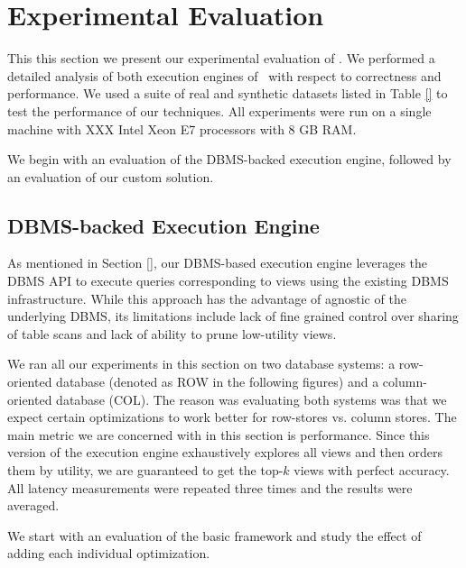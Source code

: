 \section{Experimental Evaluation}
\label{sec:experiments}

This this section we present our experimental evaluation of \VizRecDB.
We performed a detailed analysis of both execution engines of \VizRecDB\ with
respect to correctness and performance.
We used a suite of real and synthetic datasets listed in Table \ref{} to test the
performance of our techniques.
All experiments were run on a single
machine with XXX Intel Xeon E7 processors with 8 GB
RAM.

We begin with an evaluation of the DBMS-backed execution engine, followed by an
evaluation of our custom solution.

\subsection{DBMS-backed Execution Engine}
\label{sec:dbms_execution_engine}

As mentioned in Section \ref{}, our DBMS-based execution engine leverages the
DBMS API to execute queries corresponding to views using the existing DBMS
infrastructure.
While this approach has the advantage of agnostic of the underlying DBMS, its
limitations include lack of fine grained control over sharing of table scans and
lack of ability to prune low-utility views.

We ran all our experiments in this section on two database systems: a
row-oriented database (denoted as ROW in the following figures) and a
column-oriented database (COL).
The reason was evaluating both systems was that we expect certain
optimizations to work better for row-stores vs. column stores.
The main metric we are concerned with in this section is performance.
Since this version of the execution engine exhaustively explores all views and
then orders them by utility, we are guaranteed to get the top-$k$ views with
perfect accuracy.
All latency measurements were repeated three times and the results were
averaged.

We start with an evaluation of the basic framework and study the effect of
adding each individual optimization.\\

